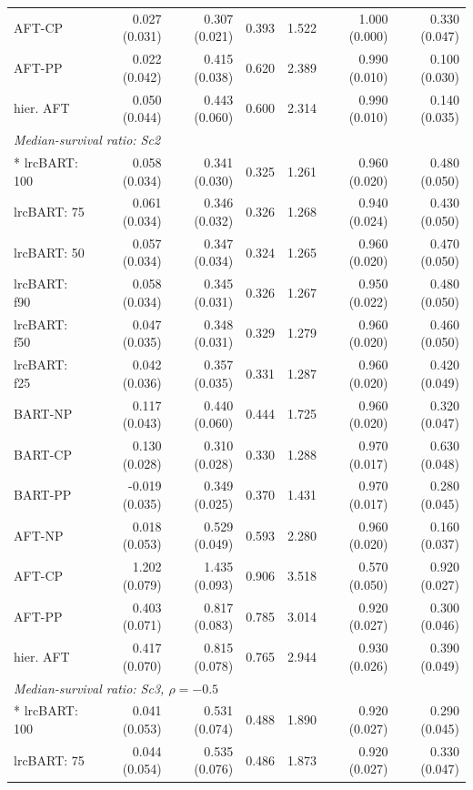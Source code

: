 \begin{landscape}
\begin{longtable}{lrrrrrr}
AFT-CP & 0.027 (0.031) & 0.307 (0.021) & 0.393 & 1.522 & 1.000 (0.000) & 0.330 (0.047) \\
AFT-PP & 0.022 (0.042) & 0.415 (0.038) & 0.620 & 2.389 & 0.990 (0.010) & 0.100 (0.030) \\
hier. AFT & 0.050 (0.044) & 0.443 (0.060) & 0.600 & 2.314 & 0.990 (0.010) & 0.140 (0.035) \\
\multicolumn{7}{l}{\strut\textit{Median-survival ratio: Sc2}}\\*
lrcBART: 100 & 0.058 (0.034) & 0.341 (0.030) & 0.325 & 1.261 & 0.960 (0.020) & 0.480 (0.050) \\
lrcBART: 75 & 0.061 (0.034) & 0.346 (0.032) & 0.326 & 1.268 & 0.940 (0.024) & 0.430 (0.050) \\
lrcBART: 50 & 0.057 (0.034) & 0.347 (0.034) & 0.324 & 1.265 & 0.960 (0.020) & 0.470 (0.050) \\
lrcBART: f90 & 0.058 (0.034) & 0.345 (0.031) & 0.326 & 1.267 & 0.950 (0.022) & 0.480 (0.050) \\
lrcBART: f50 & 0.047 (0.035) & 0.348 (0.031) & 0.329 & 1.279 & 0.960 (0.020) & 0.460 (0.050) \\
lrcBART: f25 & 0.042 (0.036) & 0.357 (0.035) & 0.331 & 1.287 & 0.960 (0.020) & 0.420 (0.049) \\
BART-NP & 0.117 (0.043) & 0.440 (0.060) & 0.444 & 1.725 & 0.960 (0.020) & 0.320 (0.047) \\
BART-CP & 0.130 (0.028) & 0.310 (0.028) & 0.330 & 1.288 & 0.970 (0.017) & 0.630 (0.048) \\
BART-PP & -0.019 (0.035) & 0.349 (0.025) & 0.370 & 1.431 & 0.970 (0.017) & 0.280 (0.045) \\
AFT-NP & 0.018 (0.053) & 0.529 (0.049) & 0.593 & 2.280 & 0.960 (0.020) & 0.160 (0.037) \\
AFT-CP & 1.202 (0.079) & 1.435 (0.093) & 0.906 & 3.518 & 0.570 (0.050) & 0.920 (0.027) \\
AFT-PP & 0.403 (0.071) & 0.817 (0.083) & 0.785 & 3.014 & 0.920 (0.027) & 0.300 (0.046) \\
hier. AFT & 0.417 (0.070) & 0.815 (0.078) & 0.765 & 2.944 & 0.930 (0.026) & 0.390 (0.049) \\
\multicolumn{7}{l}{\strut\textit{Median-survival ratio: Sc3, $\rho=-0.5$}}\\*
lrcBART: 100 & 0.041 (0.053) & 0.531 (0.074) & 0.488 & 1.890 & 0.920 (0.027) & 0.290 (0.045) \\
lrcBART: 75 & 0.044 (0.054) & 0.535 (0.076) & 0.486 & 1.873 & 0.920 (0.027) & 0.330 (0.047) \\

\end{longtable}
\end{landscape}
